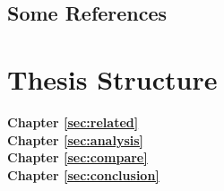 \subsection{Some References}
\label{sec:intro:results:refs}

\section{Thesis Structure}
\label{sec:intro:structure}

\textbf{Chapter \ref{sec:related}} \\[0.2em]

\textbf{Chapter \ref{sec:analysis}} \\[0.2em]

\textbf{Chapter \ref{sec:compare}} \\[0.2em]

\textbf{Chapter \ref{sec:conclusion}} \\[0.2em]
